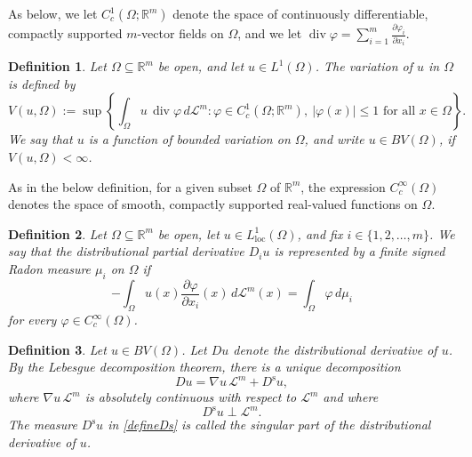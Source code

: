 \documentclass[10pt,a4paper]{amsart}
\newtheorem{definition}{Definition}
\begin{document}
 As below, we let $C_c^1(\Omega;\mathbb R^m)$ denote the space of continuously differentiable, compactly supported $m$-vector fields on $\Omega$, and we let 
 $ \operatorname{div}\varphi = \sum_{i=1}^m \frac{\partial \varphi_i}{\partial x_i}$.

\begin{definition}\label{defineBV}
 Let $\Omega\subseteq\mathbb R^m$ be open, and let $u\in L^1(\Omega)$. The \emph{variation} of $u$ in $\Omega$ is defined by
$$ V(u,\Omega) := \sup\left\{
\int_{\Omega} u\,\operatorname{div}\varphi \, d\mathcal L^m : \varphi\in C_c^1(\Omega;\mathbb R^m),\
|\varphi(x)|\leq 1 \text{ for all } x\in\Omega
\right\}. $$
We say that $u$ is a \emph{function of bounded variation} on $\Omega$,
and write $ u\in BV(\Omega)$, if $ V(u,\Omega)<\infty$. 
\end{definition}

 As in the below definition, for a given subset $\Omega$ of $\mathbb{R}^{m}$, 
 the expression $C_{c}^{\infty}(\Omega)$ denotes the 
 space of smooth, compactly supported real-valued functions on $\Omega$. 

\begin{definition}
 Let $ \Omega \subseteq \mathbb R^m$ be open, let \(u\in L^1_{\mathrm{loc}}(\Omega)\), and fix \(i\in\{1, 2, \ldots,m\}\). We say that the distributional partial derivative \(D_i u\) 
 is \emph{represented} by a finite signed Radon measure \(\mu_i\)
on \(\Omega\) if
\[
-\int_\Omega u(x)\frac{\partial \varphi}{\partial x_i}(x)\,d\mathcal L^m(x)
=
\int_\Omega \varphi\,d\mu_i
\]
for every \(\varphi\in C_c^\infty(\Omega)\). 
\end{definition}

\begin{definition} 
 Let $u\in BV(\Omega)$. Let $Du$ denote the distributional derivative of $u$. By the Lebesgue decomposition
 theorem, there is a unique decomposition
\begin{equation}\label{defineDs}
Du=\nabla u\,\mathcal L^m+D^{\operatorname{s}} u,
\end{equation}
where $\nabla u\,\mathcal L^m$ is absolutely continuous with respect to
$\mathcal L^m$ and where 
\begin{equation}\label{DsuperpLm} 
 D^{\operatorname{s}} u\perp\mathcal L^m. 
\end{equation}
 The measure $D^{\operatorname{s}} u$ in \eqref{defineDs} is called
 the \emph{singular part of the distributional derivative of $u$}. 
\end{definition}
\end{document}
